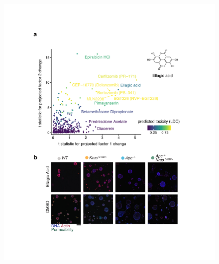 \begin{flushleft}
\begin{figure}[h]
\centering
\includegraphics[width=\textwidth,
                height=\textheight,
                keepaspectratio]{figures/adenomaprofiling/pdf/fig_5_1.pdf}
\caption{}
\label{fig_180}
\end{figure}
\bigbreak

\end{flushleft}